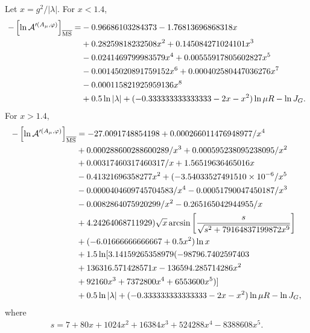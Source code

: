 \documentclass[12pt]{article}
\begin{document}
\begin{itemize}
       Let $x=g^2/|\lambda|$.
       For $x<1.4$,
       \begin{align}
        -\left[\ln\mathcal A'^{(A_\mu,\varphi)}\right]_{\overline{\rm MS}} = & 
         -0.96686103284373 - 1.76813696868318 x\nonumber                          \\
         & + 0.28259818232508 x^2 + 0.145084271024101 x^3\nonumber       \\
         & - 0.0241469799983579 x^4 + 0.00555917805602827 x^5\nonumber   \\
         & - 0.00145020891759152 x^6 + 0.000402580447036276 x^7\nonumber \\
         & - 0.000115821925959136 x^8 \nonumber         \\
         & + 0.5\ln|\lambda| + (-0.333333333333333 -  2 x -  x^2) \ln\mu R -\ln J_G.
       \end{align}
       For $x>1.4$,
       \begin{align}
        -\left[\ln\mathcal A'^{(A_\mu,\varphi)}\right]_{\overline{\rm MS}}
         & = -27.0091748854198 + 0.000266011476948977/x^4\nonumber                               \\
         & + 0.000288600288600289/x^3 + 0.000595238095238095/x^2\nonumber           \\
         & + 0.00317460317460317/x + 1.56519636465016 x\nonumber                    \\
         & - 0.41321696358277 x^2 + (-3.54033527491510\times 10^{-6}/x^{5}\nonumber \\
         & - 0.0000404609745704583/x^{4} - 0.00051790047450187/x^{3}\nonumber       \\
         & - 0.0082864075920299/x^{2} - 0.265165042944955/x\nonumber                \\
         & + 4.24264068711929) \sqrt{x}\arcsin
        \left[
         \frac{s}{\sqrt{s^2+79164837199872 x^9}}
        \right]\nonumber                                                                         \\
         & + (-6.01666666666667 +  0.5 x^2)\ln x\nonumber                           \\
         & + 1.5\ln[3.14159265358979 (-98796.7402597403\nonumber                    \\
         & + 136316.571428571 x -136594.285714286 x^2\nonumber                      \\
         & + 92160 x^3 +7372800 x^4 + 6553600 x^5)]\nonumber                        \\
         & +  0.5 \ln|\lambda| + (-0.333333333333333 -  2 x - x^2) \ln\mu R -\ln J_G,
       \end{align}
       where
       \begin{align}
        s = 7 + 80 x +1024 x^2 + 16384 x^3 +524288 x^4 -  8388608 x^5.
       \end{align}
\end{itemize}

%


\end{document}

